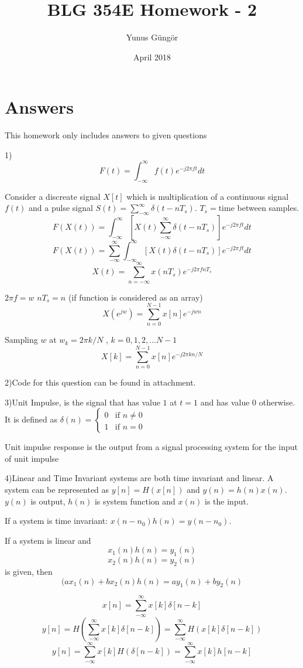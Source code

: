 \documentclass{article}
\title{BLG 354E Homework - 2}
\author{Yunus Güngör }
\date{April 2018}
\begin{document}
	
	\maketitle
	
	\section{Answers}
	
	This homework only includes answers to given questions
	
	1)$$F(t)=\int_{-\infty}^{\infty}f(t)e^{-j2\pi ft}dt$$
	\par
	Consider a discreate signal $X[t]$ which is multiplication of a continuous signal $f(t)$ and a pulse signal $S(t)=\sum_{-\infty}^{\infty}\delta (t-nT_s)$. $T_s=$time between samples.
	$$F(X(t))=\int_{-\infty}^{\infty}[X(t)\sum_{-\infty}^{\infty}\delta(t-nT_s)]e^{-j2 \pi ft}dt$$
	$$F(X(t))=\sum_{-\infty}^{\infty}\int_{-\infty}^{\infty}[X(t)\delta(t-nT_s)]e^{-j2 \pi ft}dt$$
	$$X(t)=\sum_{n=-\infty}^{\infty}x(nT_s)e^{-j2 \pi f n T_s}$$
	\par
	$2 \pi f =w$ $nT_s=n$ (if function is considered as an array)
	$$X(e^{jw})=\sum_{n=0}^{N-1}x[n]e^{-jwn}$$
	\par
		Sampling $w$ at $w_k=2\pi k / N$ , $k=0,1,2,...N-1$
	$$X[k]=\sum_{n=0}^{N-1}x[n]e^{-j2\pi kn/N}$$
	\par
	
	2)Code for this question can be found in attachment.
	
	3)Unit Impulse, is the signal that has value $1$ at $t=1$ and has value $0$ otherwise. It is defined as $\delta(n) = \begin{cases}
	0  & \text{if } n \neq 0 \\
	1  & \text{if } n=0
	\end{cases} \quad$
	\par
	Unit impulse response is the output from a signal processing system for the input of unit impulse
	\par

	4)Linear and Time Invariant systems are both time invariant and linear. A system can be represented as $y[n]=H(x[n])$ and $y(n)=h(n)x(n)$. $y(n)$ is output, $h(n)$ is system function and $x(n)$ is the input.
	\par
	If a system is time invariant: $x(n-n_0)h(n)=y(n-n_0)$.
	\par
	If a system is linear and $$x_1(n)h(n)=y_1(n)$$ $$x_2(n)h(n)=y_2(n)$$ is given, then $$(ax_1(n)+bx_2(n)h(n)=ay_1(n)+by_2(n)$$
	\par
	$$x[n]=\sum_{-\infty}^{\infty}x[k]\delta[n-k]$$
	$$y[n]=H(\sum_{-\infty}^{\infty}x[k]\delta[n-k])=\sum_{-\infty}^{\infty}H(x[k]\delta[n-k])$$
	$$y[n]=\sum_{-\infty}^{\infty}x[k]H(\delta[n-k])=\sum_{-\infty}^{\infty}x[k]h[n-k]$$
	
\end{document}
